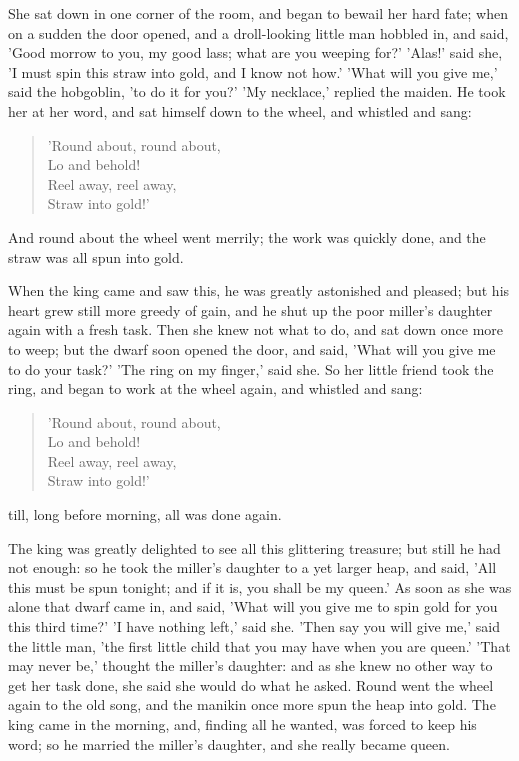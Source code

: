 \documentclass[12pt]{book}
\begin{document}
She sat down in one corner of the room, and began to bewail her hard
fate; when on a sudden the door opened, and a droll-looking little man
hobbled in, and said, 'Good morrow to you, my good lass; what are you
weeping for?' 'Alas!' said she, 'I must spin this straw into gold, and
I know not how.' 'What will you give me,' said the hobgoblin, 'to do
it for you?' 'My necklace,' replied the maiden. He took her at her
word, and sat himself down to the wheel, and whistled and sang:

\begin{verse}
 'Round about, round about,\\
    Lo and behold!\\
  Reel away, reel away,\\
    Straw into gold!'
\end{verse}

And round about the wheel went merrily; the work was quickly done, and
the straw was all spun into gold.

When the king came and saw this, he was greatly astonished and
pleased; but his heart grew still more greedy of gain, and he shut up
the poor miller's daughter again with a fresh task. Then she knew not
what to do, and sat down once more to weep; but the dwarf soon opened
the door, and said, 'What will you give me to do your task?' 'The ring
on my finger,' said she. So her little friend took the ring, and began
to work at the wheel again, and whistled and sang:

\begin{verse}
 'Round about, round about,\\
    Lo and behold!\\
  Reel away, reel away,\\
    Straw into gold!'
\end{verse}

till, long before morning, all was done again.

The king was greatly delighted to see all this glittering treasure;
but still he had not enough: so he took the miller's daughter to a yet
larger heap, and said, 'All this must be spun tonight; and if it is,
you shall be my queen.' As soon as she was alone that dwarf came in,
and said, 'What will you give me to spin gold for you this third
time?' 'I have nothing left,' said she. 'Then say you will give me,'
said the little man, 'the first little child that you may have when
you are queen.' 'That may never be,' thought the miller's daughter:
and as she knew no other way to get her task done, she said she would
do what he asked. Round went the wheel again to the old song, and the
manikin once more spun the heap into gold. The king came in the
morning, and, finding all he wanted, was forced to keep his word; so
he married the miller's daughter, and she really became queen.
\end{document}
